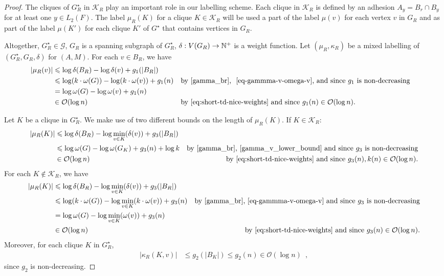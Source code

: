 \documentclass{patmorin}
\let\eqref\cref
\renewcommand{\le}{\leqslant}
\renewcommand{\leq}{\leqslant}
\newcommand{\Oh}{\calO}
\newcommand{\calG}{\mathcal{G}}
\newcommand{\calK}{\mathcal{K}}
\newcommand{\calO}{\mathcal{O}}
\begin{document}
\begin{proof}
    The cliques of $G^\star_R$ in $\calK_R$ play an important role in our labelling scheme.
    Each clique in $\calK_R$ is defined by an adhesion $A_y=B_r\cap B_y$ for at least one $y\in L_2(F)$.  The label $\mu_R(K)$ for a clique $K\in\calK_R$ will be used a part of the label $\mu(v)$ for each vertex $v$ in $G_R$ and as part of the label $\mu(K')$ for each clique $K'$ of $G^\star$ that contains vertices in $G_R$.

    Altogether, $G^\star_R\in\calG$, $G_R$ is a spanning subgraph of $G^\star_R$, $\delta:V(G_R)\to\mathbb{N}^+$ is a weight function. Let $(\mu_R,\kappa_R)$ be a mixed labelling of $(G^\star_R, G_R, \delta)$ for $(A, M)$. For each $v\in B_R$, we have
    \begin{align}
       |\mu_R(v)|&\le \log \delta(B_R)-\log\delta(v)+g_1(|B_R|)\notag\\
       &\le \log (k\cdot\omega(G)) - \log (k\cdot\omega(v)) + g_1(n)&&\textrm{by~\eqref{gamma_br}, ~\eqref{eq-gammma-v-omega-v}, and since $g_1$ is non-decreasing}\notag\\
       &= \log\omega(G) - \log\omega(v) + g_1(n)\label{eq:mu-R-bounded-in-omega}\\
       &\in\Oh(\log n)&&\textrm{by~\eqref{eq:short-td-nice-weights} and since $g_1(n)\in\Oh(\log n)$.}
       \label{eq:mu-R-in-logn}
    \end{align}

    Let $K$ be a clique in $G^\star_R$. We make use of two different bounds on the length of $\mu_R(K)$.  If $K\in\calK_R$:
    \begin{align}
       |\mu_R(K)|
       & \le\log \delta(B_R) - \log \min_{v\in K}(\delta(v)) + g_3(|B_R|) \notag \\
       & \le\log \omega(G) - \log \omega(G_K) + g_3(n) + \log k
       & \textrm{by~\eqref{gamma_br},~\eqref{gamma_v_lower_bound} and since $g_3$ is non-decreasing} \label{mu_RK_i}\\
       &\in\Oh(\log n)&\textrm{by~\eqref{eq:short-td-nice-weights} and since $g_3(n), k(n)\in\Oh(\log n).$}
    \end{align}
    For each $K\not\in\calK_R$, we have
    \begin{align}
       |\mu_R(K)|
       & \le\log \delta(B_R) - \log\min_{v\in K}(\delta(v)) + g_3(|B_R|) \notag \\
       & \le\log(k\cdot\omega(G)) - \log\min_{v\in K}(k\cdot\omega(v)) + g_3(n)
       & \text{by \eqref{gamma_br},~\eqref{eq-gammma-v-omega-v} and since $g_3$ is non-decreasing}\notag\\
       & = \log \omega(G) - \log\min_{v\in K}(\omega(v)) + g_3(n)
       \label{mu_RK_ii}\\
       &\in\Oh(\log n)&\textrm{by~\eqref{eq:short-td-nice-weights} and since $g_3(n)\in\Oh(\log n)$.}
       \label{eq:mu_R(K)-in-logn}
    \end{align}
    Moreover, for each clique $K$ in $G^\star_R$,
    \begin{align}
      |\kappa_R(K,v)|
      & \leq g_2(|B_K|) \leq g_2(n) \in \Oh(\log n) \enspace ,
      \label{eq:kappa_R-logn}
    \end{align}
    since $g_2$ is non-decreasing.%


\end{proof}
\end{document}
